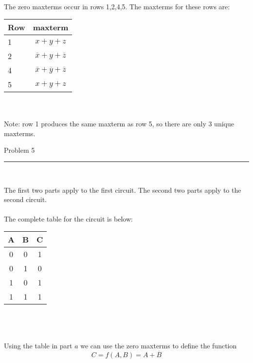 \documentclass[11pt,reqno]{article}
\begin{document}
\noindent{}\\ 

\noindent The zero maxterms occur in rows 1,2,4,5. The maxterms for these rows are:\\

\begin{tabular}{| l | c |}
\hline
Row & maxterm \\ \hline
1 & $x + y + z$ \\ \hline
2 & $\overline{x} + y + \overline{z}$ \\ \hline
4 & $\overline{x} + \overline{y} + \overline{z}$ \\ \hline
5 & $x + y + z$ \\ \hline
\end{tabular}\\ \\

\noindent Note: row 1 produces the same maxterm as row 5, so there are only 3 unique maxterms.\\
\newpage

\begin{flushleft} 
Problem 5 \\
\rule{500pt}{1pt}\\
\end{flushleft} 

\noindent The first two parts apply to the first circuit. The second two parts apply to the second circuit.\\

\noindent{}\\ 

The complete table for the circuit is below:\\

\begin{tabular}{| c | c | c |}
\hline
A & B & C \\ \hline
0 & 0 & 1 \\ \hline
0 & 1 & 0 \\ \hline
1 & 0 & 1 \\ \hline
1 & 1 & 1 \\ \hline
\end{tabular}\\ \\

\noindent{}\\ 

Using the table in part $a$ we can use the zero maxterms to define the function
\[ C = f(A,B) = A + \overline{B}\]
\end{document}
